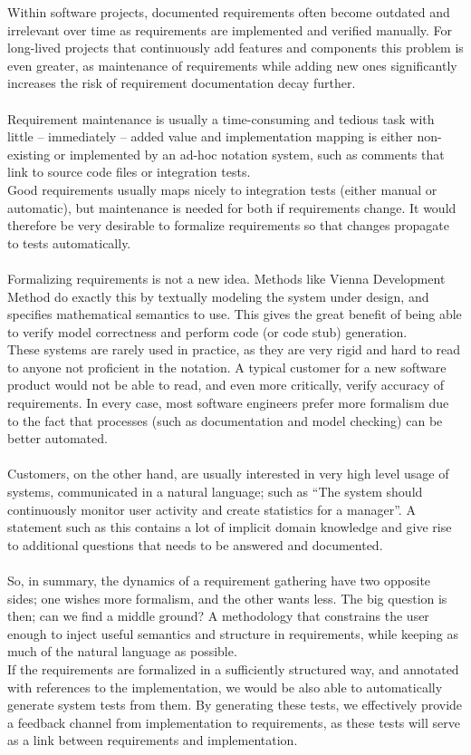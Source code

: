 Within software projects, documented requirements often become outdated and irrelevant over time as requirements are implemented and verified manually. For long-lived projects that continuously add features and components this problem is even greater, as maintenance of requirements while adding new ones significantly increases the risk of requirement documentation decay further.\\\\
Requirement maintenance is usually a time-consuming and tedious task with little -- immediately -- added value and implementation mapping is either non-existing or implemented by an ad-hoc notation system, such as comments that link to source code files or integration tests.\\
Good requirements usually maps nicely to integration tests (either manual or automatic), but maintenance is needed for both if requirements change. It would therefore be very desirable to formalize requirements so that changes propagate to tests automatically.\\\\
Formalizing requirements is not a new idea. Methods like Vienna Development Method do exactly this by textually modeling the system under design, and specifies mathematical semantics to use. This gives the great benefit of being able to verify model correctness and perform code (or code stub) generation.\\
These systems are rarely used in practice, as they are very rigid and hard to read to anyone not proficient in the notation. A typical customer for a new software product would not be able to read, and even more critically, verify accuracy of requirements. In every case, most software engineers prefer more formalism due to the fact that processes (such as documentation and model checking) can be better automated.\\\\
Customers, on the other hand, are usually interested in very high level usage of systems, communicated in a natural language; such as ``The system should continuously monitor user activity and create statistics for a manager''. A statement such as this contains a lot of implicit domain knowledge and give rise to additional questions that needs to be answered and documented.\\\\
So, in summary, the dynamics of a requirement gathering have two opposite sides; one wishes more formalism, and the other wants less. The big question is then; can we find a middle ground? A methodology that constrains the user enough to inject useful semantics and structure in requirements, while keeping as much of the natural language as possible.\\
If the requirements are formalized in a sufficiently structured way, and annotated with references to the implementation, we would be also able to automatically generate system tests from them. By generating these tests, we effectively provide a feedback channel from implementation to requirements, as these tests will serve as a link between requirements and implementation.

